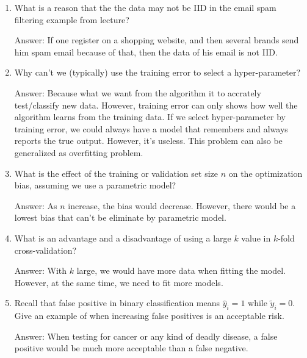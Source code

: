 \documentclass{article}
\newenvironment{answer}{\par\begingroup\color{gre}Answer: }{\endgroup}
\begin{document}
    \begin{enumerate}
        \item What is a reason that the the data may not be IID in the email spam filtering example from lecture?
        \begin{answer}
            If one register on a shopping website, and then several brands send him spam email because of that, then the data of his email is not IID.
        \end{answer}
        
        \item Why can't we (typically) use the training error to select a hyper-parameter?
        \begin{answer}
            Because what we want from the algorithm it to accrately test/classify new data. However, training error can only shows how well the algorithm learns from the training data. If we select hyper-parameter by training error, we could always have a model that remembers and always reports the true output. However, it's useless. This problem can also be generalized as overfitting problem.
        \end{answer}

        \item What is the effect of the training or validation set size $n$ on the optimization bias, assuming we use a parametric model?
        \begin{answer}
            As $n$ increase, the bias would decrease. However, there would be a lowest bias that can't be eliminate by parametric model.
        \end{answer}

        \item What is an advantage and a disadvantage of using a large $k$ value in $k$-fold cross-validation?
        \begin{answer}
            With $k$ large, we would have more data when fitting the model. However, at the same time, we need to fit more models.
        \end{answer}

        \item Recall that false positive in binary classification means $\hat y_i=1$ while $\tilde y_i = 0$. Give an example of when increasing false positives is an acceptable risk.
        \begin{answer}
            When testing for cancer or any kind of deadly disease, a false positive would be much more acceptable than a false negative.
        \end{answer}


\end{enumerate}
\end{document}
